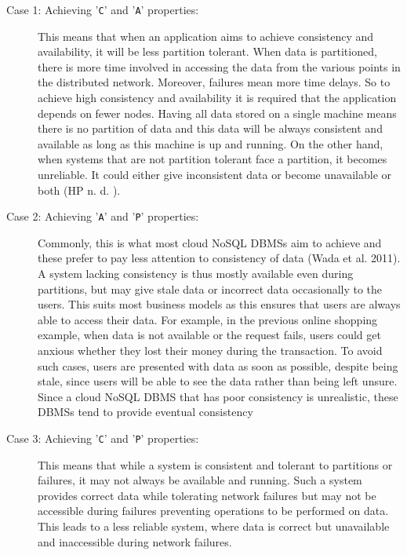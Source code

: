 \begin{description}
	  \item [Case 1: Achieving '\texttt{C}' and '\texttt{A}' properties:] This
	  means that when an application aims to achieve consistency and availability,  
	  it will be less partition tolerant. 
	When data is partitioned,   there is more time involved in accessing the data from
	the various points in the distributed network.  Moreover,   failures mean more time
	delays.  So to achieve high consistency and availability it is required
	that the application depends on fewer nodes.  Having all data stored on a single
	machine means there is no partition of data and this data will be always
	consistent and available as long as this machine is up and running.   On the
	other hand,   when systems that are not partition tolerant face a partition,  
	it becomes unreliable.  It could either give inconsistent data or become
	unavailable or both (HP n. d. ).
	
	\item [Case 2: Achieving '\texttt{A}' and '\texttt{P}' properties:]
	Commonly,   this is what most cloud \ac{NoSQL} \acp{DBMS} aim to achieve and these
	prefer to pay less attention to consistency of data (Wada et al.  2011).  A system
	lacking consistency is thus mostly available even during partitions,   but
	may give stale data or incorrect data occasionally to the users.  This suits
	most business models as this ensures that users are always able to
	access their data.  For example,   in the previous online shopping example,   when
	data is not available or the request fails,   users could get anxious whether
	they lost their money during the transaction.  To avoid such cases,   users
	are presented with data as soon as possible,   despite being stale,   since users
	will be able to see the data rather than being left unsure. 
	Since a cloud \ac{NoSQL} \ac{DBMS} that has poor consistency is unrealistic,  
	these \acp{DBMS} tend to provide eventual consistency
	
	\item [Case 3: Achieving '\texttt{C}' and '\texttt{P}' properties:] This means
	that while a system is consistent and tolerant to partitions or
	failures,   it may not always be available and running.  Such a system 
	provides correct data while tolerating network failures but may not be
	accessible during failures preventing operations to be performed on data.  This
	leads to a less reliable system,   where data is correct but unavailable and
	inaccessible during network failures. 
\end{description}

